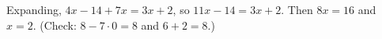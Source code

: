 Expanding, $4x-14+7x=3x+2$, so $11x-14=3x+2$. Then $8x=16$ and $x=\boxed{2}$. (Check: $8-7\cdot0=8$ and $6+2=8$.)
